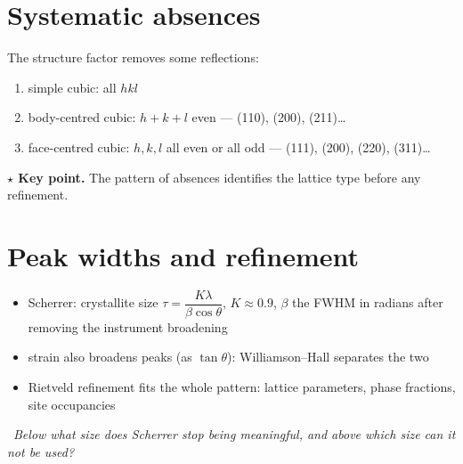 \documentclass[11pt]{article}
\newcommand\knotetime[1]{\leavevmode\llap{\color{knotemuted}\scriptsize #1\hspace{1em}}}
\newcommand\knotekey[2][]{\par\noindent#1\colorbox{knotekey!12}{\parbox{\dimexpr\linewidth-2\fboxsep}{%
  \textbf{\color{knotekey}$\star$ Key point.} #2}}\par}
\newcommand\knotequestion[2][]{\par\noindent#1{\color{knoteaccent}\textbf{?}}~\emph{#2}\par}
\newenvironment{knotechunk}{}{}
\begin{document}
\begin{knotechunk}
\section{Systematic absences}

\knotetime{18:25}The structure factor removes some reflections:

\begin{enumerate}\setlength{\itemsep}{0pt}\setlength{\parskip}{0pt}
  \item simple cubic: all $hkl$
  \item body-centred cubic: $h + k + l$ even — (110), (200), (211)…
  \item face-centred cubic: $h, k, l$ all even or all odd — (111), (200), (220), (311)…
\end{enumerate}

\knotekey[\knotetime{20:05}]{The pattern of absences identifies the lattice type before any refinement.}
\end{knotechunk}

\begin{knotechunk}
\section{Peak widths and refinement}

\begin{itemize}\setlength{\itemsep}{0pt}\setlength{\parskip}{0pt}
  \item Scherrer: crystallite size $\tau = \dfrac{K\lambda}{\beta\cos\theta}$, $K \approx 0.9$, $\beta$ the FWHM in radians after removing the instrument broadening
  \item strain also broadens peaks (as $\tan\theta$): Williamson–Hall separates the two
  \item Rietveld refinement fits the whole pattern: lattice parameters, phase fractions, site occupancies
\end{itemize}

\knotequestion[\knotetime{29:40}]{Below what size does Scherrer stop being meaningful, and above which size can it not be used?}
\end{knotechunk}
\end{document}
